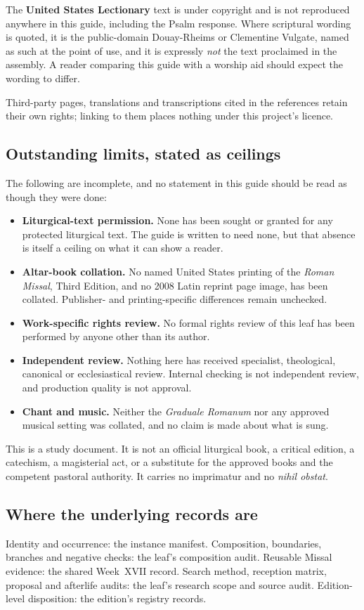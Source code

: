 The \textbf{United States Lectionary} text is under copyright and is not reproduced anywhere in this guide, including the Psalm response. Where scriptural wording is quoted, it is the public-domain Douay-Rheims or Clementine Vulgate, named as such at the point of use, and it is expressly \emph{not} the text proclaimed in the assembly. A reader comparing this guide with a worship aid should expect the wording to differ.

Third-party pages, translations and transcriptions cited in the references retain their own rights; linking to them places nothing under this project's licence.

\subsection*{Outstanding limits, stated as ceilings}

The following are incomplete, and no statement in this guide should be read as though they were done:

\begin{itemize}
\item \textbf{Liturgical-text permission.} None has been sought or granted for any protected liturgical text. The guide is written to need none, but that absence is itself a ceiling on what it can show a reader.
\item \textbf{Altar-book collation.} No named United States printing of the \emph{Roman Missal}, Third Edition, and no 2008 Latin reprint page image, has been collated. Publisher- and printing-specific differences remain unchecked.
\item \textbf{Work-specific rights review.} No formal rights review of this leaf has been performed by anyone other than its author.
\item \textbf{Independent review.} Nothing here has received specialist, theological, canonical or ecclesiastical review. Internal checking is not independent review, and production quality is not approval.
\item \textbf{Chant and music.} Neither the \emph{Graduale Romanum} nor any approved musical setting was collated, and no claim is made about what is sung.
\end{itemize}

This is a study document. It is not an official liturgical book, a critical edition, a catechism, a magisterial act, or a substitute for the approved books and the competent pastoral authority. It carries no imprimatur and no \emph{nihil obstat}.

\subsection*{Where the underlying records are}

Identity and occurrence: the instance manifest. Composition, boundaries, branches and negative checks: the leaf's composition audit. Reusable Missal evidence: the shared Week~XVII record. Search method, reception matrix, proposal and afterlife audits: the leaf's research scope and source audit. Edition-level disposition: the edition's registry records.
